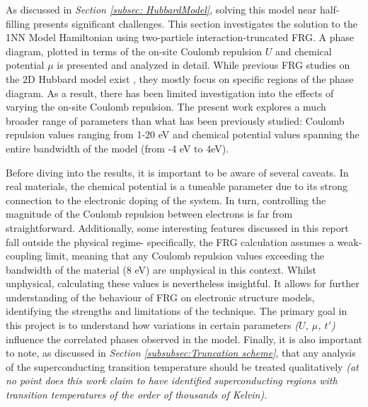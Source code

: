 \documentclass[11pt]{article}
\begin{document}
\noindent As discussed in \textit{Section \ref{subsec: HubbardModel}}, solving this model near half-filling presents significant challenges. 
This section investigates the solution to the 1NN Model Hamiltonian using two-particle interaction-truncated FRG.
A phase diagram, plotted in terms of the on-site Coulomb repulsion 
$U$ and chemical potential $\mu$ is presented and analyzed in detail. While previous FRG studies on the 2D Hubbard model exist \cite{beyer2023rashba,hille2020quantitative,vilardi2020dynamical},
they mostly focus on specific regions of the phase diagram. As a result, there has been limited investigation into the effects of varying the on-site Coulomb repulsion.
The present work explores a much broader range of parameters than what has been previously studied: Coulomb repulsion values ranging from 1-20 eV 
and chemical potential values spanning the entire bandwidth of the model (from -4 eV to 4eV). \par

\medskip


\noindent Before diving into the results, it is important to be aware of several caveats. In real materials,  the chemical potential is a tuneable parameter due to its strong connection to the electronic doping of the system.
In turn, controlling the magnitude of the Coulomb repulsion between electrons is far from straightforward. 
Additionally, some interesting features discussed in this report fall outside the physical regime- specifically, the FRG calculation assumes a weak-coupling limit, meaning that any Coulomb 
repulsion values exceeding the bandwidth of the material (8 eV) are unphysical in this context.
Whilst unphysical, calculating these values is nevertheless insightful. It allows for further
understanding of the behaviour of FRG on electronic structure models, identifying the 
strengths and limitations of the technique. The primary goal in this project is to understand how variations in certain parameters \textit{($U$, $\mu$, $t'$)} influence the correlated phases observed in the model. 
Finally, it is also important to note, as discussed in \textit{Section \ref{subsubsec:Truncation scheme}}, that any analysis of the 
superconducting transition temperature should be treated qualitatively \textit{(at no point does this work claim to have identified superconducting 
regions with transition temperatures of the order of thousands of Kelvin)}.
\end{document}
